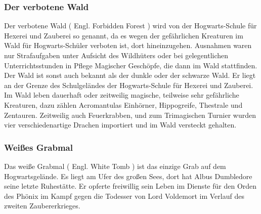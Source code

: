 \documentclass[a4paper, 10pt]{article}
\begin{document}
\subsubsection*{\large Der verbotene Wald}
Der verbotene Wald (  Engl.  Forbidden Forest ) wird von der Hogwarts-Schule für Hexerei und Zauberei so genannt, da es wegen der gefährlichen Kreaturen im Wald für Hogwarts-Schüler verboten ist, dort hineinzugehen. Ausnahmen waren nur Strafaufgaben unter Aufsicht des Wildhüters oder bei gelegentlichen Unterrichtsstunden in Pflege Magischer Geschöpfe, die dann im Wald stattfinden. Der Wald ist sonst auch bekannt als der dunkle oder der schwarze Wald. Er liegt an der Grenze des Schulgeländes der Hogwarts-Schule für Hexerei und Zauberei.
\vspace{10pt}
\newline
Im Wald leben dauerhaft oder zeitweilig magische, teilweise sehr gefährliche Kreaturen, dazu zählen Acromantulas Einhörner, Hippogreife, Thestrale und Zentauren. Zeitweilig auch Feuerkrabben, und zum Trimagischen Turnier wurden vier verschiedenartige Drachen importiert und im Wald versteckt gehalten.
\subsubsection*{\large Weißes Grabmal}
Das weiße Grabmal (  Engl.  White Tomb ) ist das einzige Grab auf dem Hogwartsgelände. Es liegt am Ufer des großen Sees, dort hat Albus Dumbledore seine letzte Ruhestätte. Er opferte freiwillig sein Leben im Dienste für den Orden des Phönix im Kampf gegen die Todesser von Lord Voldemort im Verlauf des zweiten Zaubererkrieges.
\end{document}
